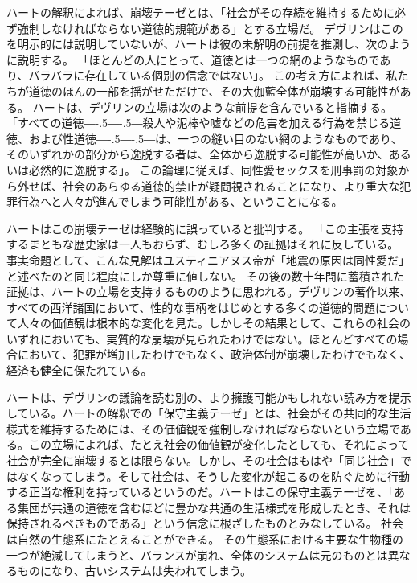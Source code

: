 \documentclass[paper=a4,book,openany]{jlreq}
\newcommand{\ig}[1]{}           %
\def\DDASH{―\kern-.5\zw―\kern-.5\zw―} %
\begin{document}
ハートの解釈によれば、崩壊テーゼとは、「社会がその存続を維持するために必ず強制しなければならない道徳的規範がある」とする立場だ。
デヴリン\ig{Patrick Devlin}はこのを明示的には説明していないが、ハートは彼の未解明の前提を推測し、次のように説明する。
「ほとんどの人にとって、道徳とは一つの網のようなものであり、バラバラに存在している個別の信念ではない」\citep[pp. 50--51]{hart63:_law_liber_and_moral}。
この考え方によれば、私たちが道徳のほんの一部を揺がせただけで、その大伽藍全体が崩壊する可能性がある。
ハートは、デヴリン\ig{Patrick Devlin}の立場は次のような前提を含んでいると指摘する。
「すべての道徳{\DDASH}殺人や泥棒や嘘などの危害を加える行為を禁じる道徳、および性道徳{\DDASH}は、一つの縫い目のない網のようなものであり、そのいずれかの部分から逸脱する者は、全体から逸脱する可能性が高いか、あるいは必然的に逸脱する」\citep[p.50]{hart63:_law_liber_and_moral}。
この論理に従えば、同性愛セックスを刑事罰の対象から外せば、社会のあらゆる道徳的禁止が疑問視されることになり、より重大な犯罪行為へと人々が進んでしまう可能性がある、ということになる。

ハートはこの崩壊テーゼは経験的に誤っていると批判する。
「この主張を支持するまともな歴史家は一人もおらず、むしろ多くの証拠はそれに反している。
事実命題として、こんな見解はユスティニアヌス帝が「地震の原因は同性愛だ」と述べたのと同じ程度にしか尊重に値しない\citep[p.4]{hart63:_law_liber_and_moral}。
その後の数十年間に蓄積された証拠は、ハートの立場を支持するもののように思われる。デヴリン\ig{Patrick Devlin}の著作以来、すべての西洋諸国において、性的な事柄をはじめとする多くの道徳的問題について人々の価値観は根本的な変化を見た。しかしその結果として、これらの社会のいずれにおいても、実質的な崩壊が見られたわけではない。ほとんどすべての場合において、犯罪が増加したわけでもなく、政治体制が崩壊したわけでもなく、経済も健全に保たれている。

ハートは、デヴリンの議論を読む別の、より擁護可能かもしれない読み方を提示している。ハートの解釈での「保守主義テーゼ」とは、社会がその共同的な生活様式を維持するためには、その価値観を強制しなければならないという立場である。この立場によれば、たとえ社会の価値観が変化したとしても、それによって社会が完全に崩壊するとは限らない。しかし、その社会はもはや「同じ社会」ではなくなってしまう。そして社会は、そうした変化が起こるのを防ぐために行動する正当な権利を持っているというのだ。ハートはこの保守主義テーゼを、「ある集団が共通の道徳を含むほどに豊かな共通の生活様式を形成したとき、それは保持されるべきものである」という信念に根ざしたものとみなしている\citep[p.4]{hart63:_law_liber_and_moral}。
社会は自然の生態系にたとえることができる。
その生態系における主要な生物種の一つが絶滅してしまうと、バランスが崩れ、全体のシステムは元のものとは異なるものになり、古いシステムは失われてしまう。
\end{document}
